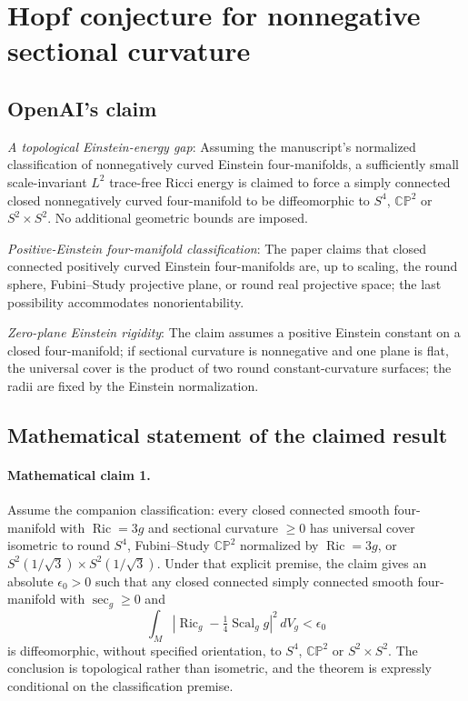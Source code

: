 \documentclass[11pt]{article}
\begin{document}
\section*{Hopf conjecture for nonnegative sectional curvature}

\subsection{OpenAI's claim}
\textit{A topological Einstein-energy gap}: Assuming the manuscript's normalized classification of nonnegatively curved Einstein four-manifolds, a sufficiently small scale-invariant $L^2$ trace-free Ricci energy is claimed to force a simply connected closed nonnegatively curved four-manifold to be diffeomorphic to $S^4$, $\mathbb{CP}^2$ or $S^2\times S^2$. No additional geometric bounds are imposed.

\textit{Positive-Einstein four-manifold classification}: The paper claims that closed connected positively curved Einstein four-manifolds are, up to scaling, the round sphere, Fubini--Study projective plane, or round real projective space; the last possibility accommodates nonorientability.

\textit{Zero-plane Einstein rigidity}: The claim assumes a positive Einstein constant on a closed four-manifold; if sectional curvature is nonnegative and one plane is flat, the universal cover is the product of two round constant-curvature surfaces; the radii are fixed by the Einstein normalization.

\subsection{Mathematical statement of the claimed result}
\paragraph{Mathematical claim 1.} Assume the companion classification: every closed connected smooth four-manifold with $\operatorname{Ric}=3g$ and sectional curvature $\ge0$ has universal cover isometric to round $S^4$, Fubini--Study $\mathbb{CP}^2$ normalized by $\operatorname{Ric}=3g$, or $S^2(1/\sqrt3)\times S^2(1/\sqrt3)$. Under that explicit premise, the claim gives an absolute $\epsilon_0>0$ such that any closed connected simply connected smooth four-manifold with $\sec_g\ge0$ and \[\int_M\left|\operatorname{Ric}_g-\tfrac14\operatorname{Scal}_g g\right|^2\,dV_g<\epsilon_0\] is diffeomorphic, without specified orientation, to $S^4$, $\mathbb{CP}^2$ or $S^2\times S^2$. The conclusion is topological rather than isometric, and the theorem is expressly conditional on the classification premise.
\end{document}
